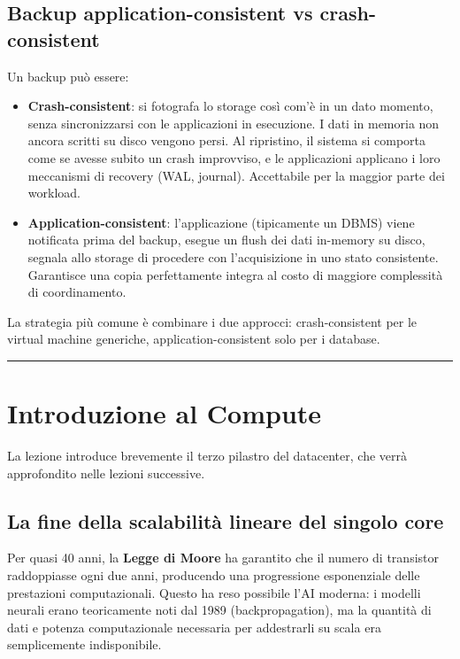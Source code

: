\documentclass[
  italian,
  openany]{book}
\providecommand{\tightlist}{%
  \setlength{\itemsep}{0pt}\setlength{\parskip}{0pt}}
\begin{document}
\subsection{Backup application-consistent vs
crash-consistent}\label{backup-application-consistent-vs-crash-consistent}

Un backup può essere:

\begin{itemize}
\tightlist
\item
  \textbf{Crash-consistent}: si fotografa lo storage così com'è in un
  dato momento, senza sincronizzarsi con le applicazioni in esecuzione.
  I dati in memoria non ancora scritti su disco vengono persi. Al
  ripristino, il sistema si comporta come se avesse subito un crash
  improvviso, e le applicazioni applicano i loro meccanismi di recovery
  (WAL, journal). Accettabile per la maggior parte dei workload.
\item
  \textbf{Application-consistent}: l'applicazione (tipicamente un DBMS)
  viene notificata prima del backup, esegue un flush dei dati in-memory
  su disco, segnala allo storage di procedere con l'acquisizione in uno
  stato consistente. Garantisce una copia perfettamente integra al costo
  di maggiore complessità di coordinamento.
\end{itemize}

La strategia più comune è combinare i due approcci: crash-consistent per
le virtual machine generiche, application-consistent solo per i
database.

\begin{center}\rule{0.5\linewidth}{0.5pt}\end{center}

\section{Introduzione al Compute}\label{introduzione-al-compute}

La lezione introduce brevemente il terzo pilastro del datacenter, che
verrà approfondito nelle lezioni successive.

\subsection{La fine della scalabilità lineare del singolo
core}\label{la-fine-della-scalabilituxe0-lineare-del-singolo-core}

Per quasi 40 anni, la \textbf{Legge di Moore} ha garantito che il numero
di transistor raddoppiasse ogni due anni, producendo una progressione
esponenziale delle prestazioni computazionali. Questo ha reso possibile
l'AI moderna: i modelli neurali erano teoricamente noti dal 1989
(backpropagation), ma la quantità di dati e potenza computazionale
necessaria per addestrarli su scala era semplicemente indisponibile.
\end{document}
